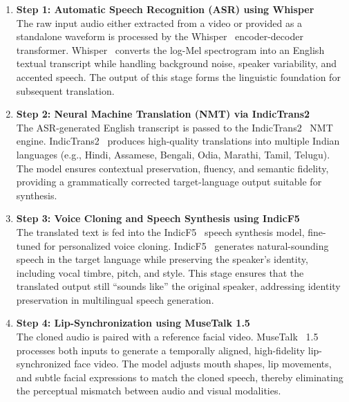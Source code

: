 \documentclass[12pt,oneside]{report}
\begin{document}
\begin{enumerate}
    \item \textbf{Step 1: Automatic Speech Recognition (ASR) using Whisper}\\
    The raw input audio either extracted from a video or provided as a standalone waveform is processed by the Whisper~\cite{radford2023whisper} encoder-decoder transformer.  
    Whisper~\cite{radford2023whisper} converts the log-Mel spectrogram into an English textual transcript while handling background noise, speaker variability, and accented speech. The output of this stage forms the linguistic foundation for subsequent translation.

    \item \textbf{Step 2: Neural Machine Translation (NMT) via IndicTrans2}\\
    The ASR-generated English transcript is passed to the IndicTrans2~\cite{gala2023indictrans2} NMT engine.  
    IndicTrans2~\cite{gala2023indictrans2} produces high-quality translations into multiple Indian languages (e.g., Hindi, Assamese, Bengali, Odia, Marathi, Tamil, Telugu).  
    The model ensures contextual preservation, fluency, and semantic fidelity, providing a grammatically corrected target-language output suitable for synthesis.

    \item \textbf{Step 3: Voice Cloning and Speech Synthesis using IndicF5}\\
    The translated text is fed into the IndicF5~\cite{indicf5_2025} speech synthesis model, fine-tuned for personalized voice cloning.  
    IndicF5~\cite{indicf5_2025} generates natural-sounding speech in the target language while preserving the speaker’s identity, including vocal timbre, pitch, and style.  
    This stage ensures that the translated output still “sounds like” the original speaker, addressing identity preservation in multilingual speech generation.

    \item \textbf{Step 4: Lip-Synchronization using MuseTalk 1.5}\\
    The cloned audio is paired with a reference facial video.  
    MuseTalk~\cite{zhang2023musetalk} 1.5 processes both inputs to generate a temporally aligned, high-fidelity lip-synchronized face video.  
    The model adjusts mouth shapes, lip movements, and subtle facial expressions to match the cloned speech, thereby eliminating the perceptual mismatch between audio and visual modalities.


\end{enumerate}
\end{document}
